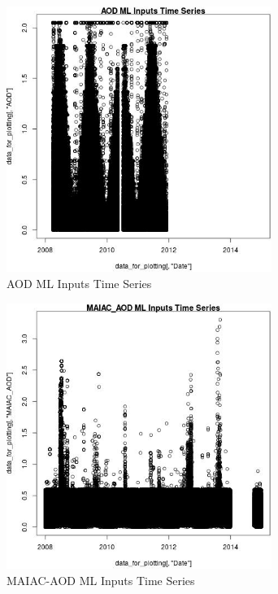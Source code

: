 \begin{figure} 
\centering  
\includegraphics[width=0.77\textwidth]{Code_Outputs/ML_input_report_ML_input_PM25_Step5_part_d_de_duplicated_aves_ML_input_AODvDate.jpg} 
\caption{\label{fig:ML_input_report_ML_input_PM25_Step5_part_d_de_duplicated_aves_ML_inputAODvDate}AOD ML Inputs Time Series} 
\end{figure} 
 

\begin{figure} 
\centering  
\includegraphics[width=0.77\textwidth]{Code_Outputs/ML_input_report_ML_input_PM25_Step5_part_d_de_duplicated_aves_ML_input_MAIAC_AODvDate.jpg} 
\caption{\label{fig:ML_input_report_ML_input_PM25_Step5_part_d_de_duplicated_aves_ML_inputMAIAC_AODvDate}MAIAC-AOD ML Inputs Time Series} 
\end{figure} 
 

